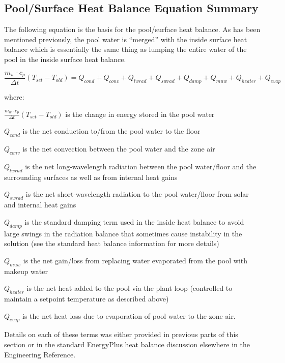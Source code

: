 \subsection{Pool/Surface Heat Balance Equation Summary}\label{poolsurface-heat-balance-equation-summary}

The following equation is the basis for the pool/surface heat balance. As has been mentioned previously, the pool water is ``merged'' with the inside surface heat balance which is essentially the same thing as lumping the entire water of the pool in the inside surface heat balance.

\begin{equation}
\frac{m_w \cdot c_p}{\Delta t} (T_{set} - T_{old}) = Q_{cond} + Q_{conv} + Q_{lwrad} + Q_{swrad} + Q_{damp} + Q_{muw} + Q_{heater} + Q_{evap}
\end{equation}

where:

\(\frac{m_w \cdot c_p}{\Delta t} (T_{set} - T_{old} )\) is the change in energy stored in the pool water

\(Q_{cond}\) is the net conduction to/from the pool water to the floor

\(Q_{conv}\) is the net convection between the pool water and the zone air

\(Q_{lwrad}\) is the net long-wavelength radiation between the pool water/floor and the surrounding surfaces as well as from internal heat gains

\(Q_{swrad}\) is the net short-wavelength radiation to the pool water/floor from solar and internal heat gains

\(Q_{damp}\) is the standard damping term used in the inside heat balance to avoid large swings in the radiation balance that sometimes cause instability in the solution (see the standard heat balance information for more details)

\(Q_{muw}\) is the net gain/loss from replacing water evaporated from the pool with makeup water

\(Q_{heater}\) is the net heat added to the pool via the plant loop (controlled to maintain a setpoint temperature as described above)

\(Q_{evap}\) is the net heat loss due to evaporation of pool water to the zone air.

Details on each of these terms was either provided in previous parts of this section or in the standard EnergyPlus heat balance discussion elsewhere in the Engineering Reference.

